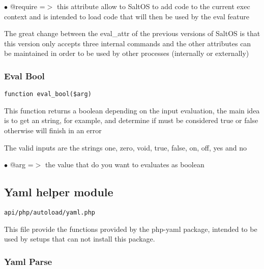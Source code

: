 \documentclass[a4paper]{article}
\begin{document}
\begin{compactitem}
\item[\color{myblue}$\bullet$] @require =$>$ this attribute allow to SaltOS to add code to the current exec
context and is intended to load code that will then be used by the eval feature
\end{compactitem}

The great change between the eval\_attr of the previous versions of SaltOS is
that this version only accepts three internal commands and the other
attributes can be maintained in order to be used by other processes
(internally or externally)

\hypertarget{toc283}{}
\subsubsection{Eval Bool}

\begin{lstlisting}
function eval_bool($arg)
\end{lstlisting}

This function returns a boolean depending on the input evaluation, the main idea
is to get an string, for example, and determine if must be considered true or false
otherwise will finish in an error

The valid inputs are the strings one, zero, void, true, false, on, off, yes and no

\begin{compactitem}
\item[\color{myblue}$\bullet$] @arg =$>$ the value that do you want to evaluates as boolean
\end{compactitem}

\hypertarget{toc284}{}
\subsection{Yaml helper module}

\begin{lstlisting}
api/php/autoload/yaml.php
\end{lstlisting}

This file provide the functions provided by the php-yaml package, intended
to be used by setups that can not install this package.

\hypertarget{toc285}{}
\subsubsection{Yaml Parse}
\end{document}
